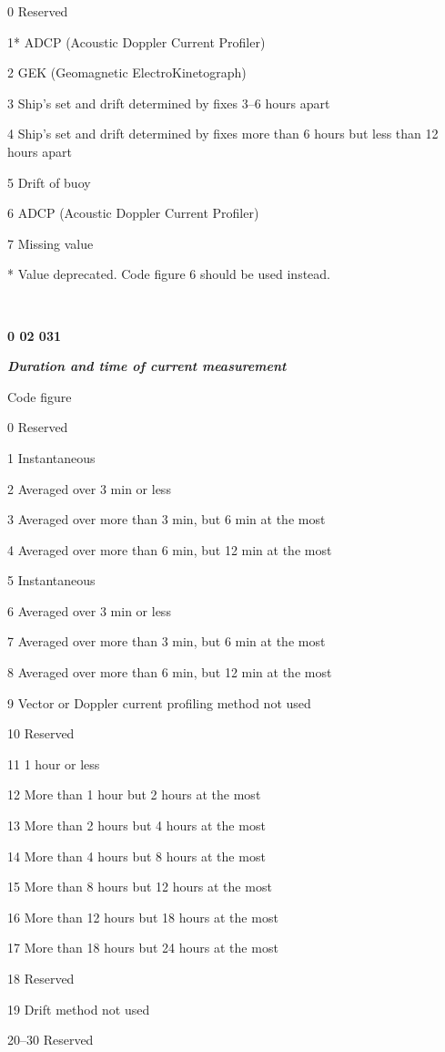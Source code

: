 0 Reserved

1* ADCP (Acoustic Doppler Current Profiler)

2 GEK (Geomagnetic ElectroKinetograph)

3 Ship's set and drift determined by fixes 3--6 hours apart

4 Ship's set and drift determined by fixes more than 6 hours but less than 12 hours apart

5 Drift of buoy

6 ADCP (Acoustic Doppler Current Profiler)

7 Missing value

* Value deprecated. Code figure 6 should be used instead.

\textbf{\\
}

\textbf{0 02 031}

\emph{\textbf{Duration and time of current measurement}}

Code figure

0 Reserved

1 Instantaneous

2 Averaged over 3 min or less

3 Averaged over more than 3 min, but 6 min at the most

4 Averaged over more than 6 min, but 12 min at the most

5 Instantaneous

6 Averaged over 3 min or less

7 Averaged over more than 3 min, but 6 min at the most

8 Averaged over more than 6 min, but 12 min at the most

9 Vector or Doppler current profiling method not used

10 Reserved

11 1 hour or less

12 More than 1 hour but 2 hours at the most

13 More than 2 hours but 4 hours at the most

14 More than 4 hours but 8 hours at the most

15 More than 8 hours but 12 hours at the most

16 More than 12 hours but 18 hours at the most

17 More than 18 hours but 24 hours at the most

18 Reserved

19 Drift method not used

20--30 Reserved

